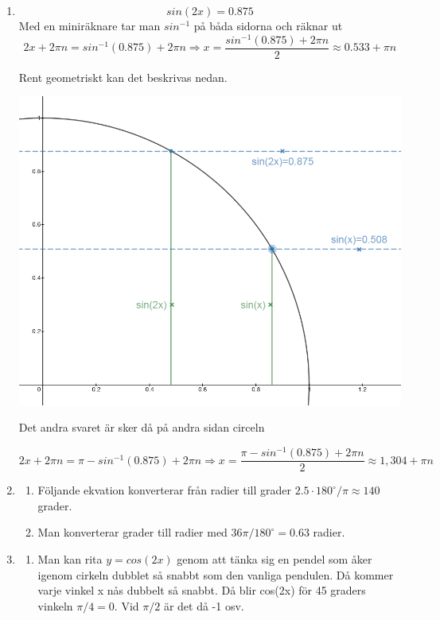 \documentclass[a4paper,12pt]{article}
\begin{document}
\begin{enumerate}
      \item $$sin(2x)=0.875$$
            Med en miniräknare tar man $sin^{-1}$ på båda sidorna och räknar ut
            $$2x+2\pi n=sin^{-1}(0.875)+2\pi n \Rightarrow x=\frac{sin^{-1}(0.875)+2\pi n}{2}\approx 0.533+\pi n$$

            Rent geometriskt kan det beskrivas nedan.

            \includegraphics[scale=0.5]{Figur1.png}

            Det andra svaret är sker då på andra sidan circeln

            $$2x+2\pi n=\pi - sin^{-1}(0.875)+2\pi n \Rightarrow x=\frac{\pi - sin^{-1}(0.875)+2\pi n}{2}\approx 1,304+\pi n$$

      \item
            \begin{enumerate}
                  \item Följande ekvation konverterar från radier till grader $2.5\cdot180^\circ/\pi\approx 140$ grader.

                  \item Man konverterar grader till radier med $36\pi/180^\circ=0.63$ radier.
            \end{enumerate}

      \item
            \begin{enumerate}
                  \item Man kan rita $y=cos(2x)$ genom att tänka sig en pendel som åker igenom cirkeln dubblet
                        så snabbt som den vanliga pendulen. Då kommer varje vinkel x nås dubbelt så snabbt. Då blir
                        cos(2x) för 45 graders vinkeln $\pi/4=0$. Vid $\pi/2$ är det då -1 osv.


\end{enumerate}
\end{enumerate}
\end{document}
